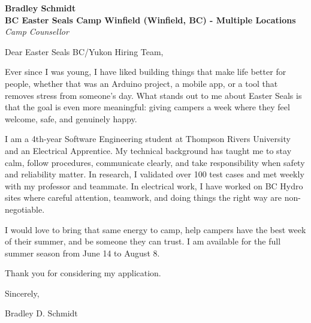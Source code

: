 \documentclass[11pt]{article}
\begin{document}
\textbf{Bradley Schmidt}\\
\vspace{0.5em}
\textbf{BC Easter Seals Camp Winfield (Winfield, BC) - Multiple Locations}\\
\textit{Camp Counsellor}

Dear Easter Seals BC/Yukon Hiring Team,

\par

Ever since I was young, I have liked building things that make life better for people, whether that was an Arduino project, a mobile app, or a tool that removes stress from someone’s day. What stands out to me about Easter Seals is that the goal is even more meaningful: giving campers a week where they feel welcome, safe, and genuinely happy.

\par

I am a 4th-year Software Engineering student at Thompson Rivers University and an Electrical Apprentice. My technical background has taught me to stay calm, follow procedures, communicate clearly, and take responsibility when safety and reliability matter. In research, I validated over 100 test cases and met weekly with my professor and teammate. In electrical work, I have worked on BC Hydro sites where careful attention, teamwork, and doing things the right way are non-negotiable.

\par

I would love to bring that same energy to camp, help campers have the best week of their summer, and be someone they can trust. I am available for the full summer season from June 14 to August 8.

\par

Thank you for considering my application.

\par

Sincerely,

\par

Bradley D. Schmidt
\end{document}
